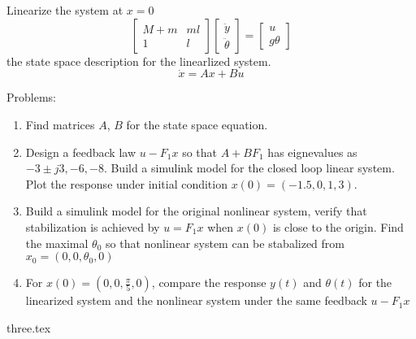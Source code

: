 {  Linearize the system at $x=0$
  \begin{equation}
    \begin{bmatrix}
      M+m & ml \\
      1 & l
    \end{bmatrix}
    \begin{bmatrix}
      \ddot y\\
      \ddot \theta
    \end{bmatrix} =
    \begin{bmatrix}
      u \\
      g\theta
    \end{bmatrix}
  \end{equation}
  the state space description for the linearlized system.
  \begin{equation}
    \dot x = Ax + Bu
  \end{equation}

  Problems:
  \begin{enumerate}[\arabic*.]
  \item Find matrices $A$, $B$ for the state space equation.
  \item Design a feedback law $u-F_1x$  so that $A+BF_1$ has eignevalues as $-3\pm j3, -6, -8$. Build a simulink
    model for the closed loop linear system. Plot the response under initial condition
    $x(0) = (-1.5, 0, 1, 3)$.
  \item Build a simulink model for the original nonlinear system, verify that stabilization is achieved by
    $u=F_1x$ when $x(0)$ is close to the origin. Find the maximal $\theta_0$ so that nonlinear system can be
    stabalized from $x_0 = (0, 0, \theta_0,0)$
  \item For $x(0)=(0,0, \frac{\pi} 5,0)$, compare the response $y(t)$ and
    $\theta(t)$ for the linearized system and the nonlinear system under the same feedback $u - F_1x$
  \end{enumerate}
}{%
  {three.tex}
}
